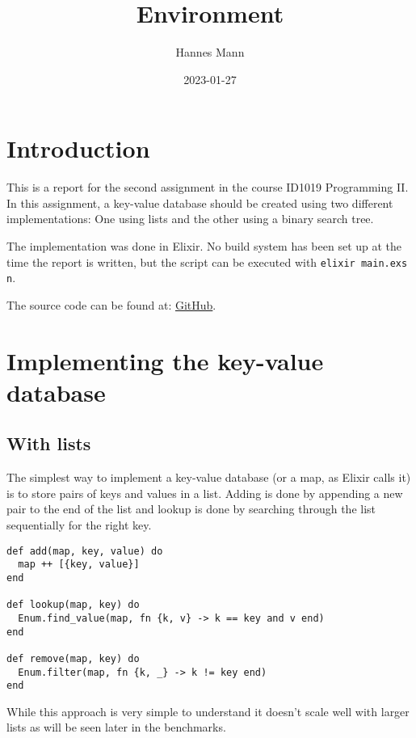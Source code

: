 \documentclass[a4paper,11pt]{article}
\begin{document}
\title{
    \textbf{Environment}
}
\author{Hannes Mann}
\date{2023-01-27}

\maketitle

\section*{Introduction}

This is a report for the second assignment in the course ID1019 Programming II.
In this assignment, a key-value database should be created using two different implementations: One using lists and the other using a binary search tree.

The implementation was done in Elixir. No build system has been set up at the time the report is written, but the script can be executed with \texttt{elixir main.exs {n}}.

The source code can be found at: \href{https://github.com/hannesmann/ID1019/tree/main/src/environment}{GitHub}.

\section*{Implementing the key-value database}

\subsection*{With lists}

The simplest way to implement a key-value database (or a map, as Elixir calls it) is to store pairs of keys and values in a list.
Adding is done by appending a new pair to the end of the list and lookup is done by searching through the list sequentially for the right key.

\begin{verbatim}
def add(map, key, value) do
  map ++ [{key, value}]
end

def lookup(map, key) do
  Enum.find_value(map, fn {k, v} -> k == key and v end)
end

def remove(map, key) do
  Enum.filter(map, fn {k, _} -> k != key end)
end
\end{verbatim}

While this approach is very simple to understand it doesn't scale well with larger lists as will be seen later in the benchmarks.
\end{document}
